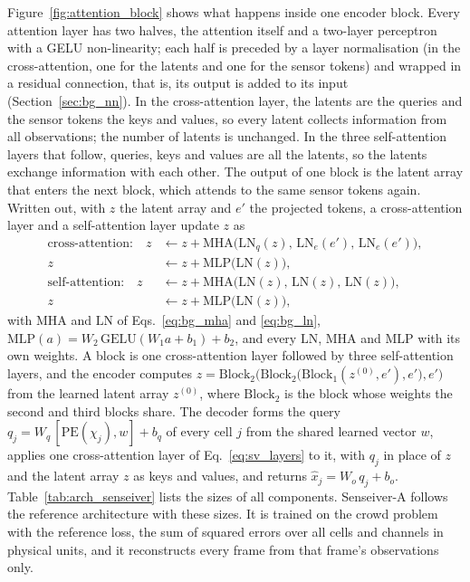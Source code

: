 \documentclass[english, 12pt, a4paper, elec, utf8, a-2b, online]{aaltothesis}
\begin{document}
Figure~\ref{fig:attention_block} shows what happens inside one encoder block.
Every attention layer has two halves, the attention itself and a two-layer
perceptron with a GELU non-linearity; each half is preceded by a layer
normalisation (in the cross-attention, one for the latents and one for the
sensor tokens) and wrapped in a residual connection, that is, its output is
added to its input (Section~\ref{sec:bg_nn}). In the cross-attention layer, the latents are the queries
and the sensor tokens the keys and values, so every latent collects information
from all observations; the number of latents is unchanged. In the three
self-attention layers that follow, queries, keys and values are all the
latents, so the latents exchange information with each other. The output of
one block is the latent array that enters the next block, which attends to the
same sensor tokens again. Written out, with $z$ the latent array and $e'$ the
projected tokens, a cross-attention layer and a self-attention layer update $z$
as
\begin{equation}
	\begin{aligned}
	\text{cross-attention:}\quad
	z &\leftarrow z + \mathrm{MHA}\big(\mathrm{LN}_{q}(z),\, \mathrm{LN}_{e}(e'),\, \mathrm{LN}_{e}(e')\big), \\
	z &\leftarrow z + \mathrm{MLP}\big(\mathrm{LN}(z)\big), \\
	\text{self-attention:}\quad
	z &\leftarrow z + \mathrm{MHA}\big(\mathrm{LN}(z),\, \mathrm{LN}(z),\, \mathrm{LN}(z)\big), \\
	z &\leftarrow z + \mathrm{MLP}\big(\mathrm{LN}(z)\big),
	\end{aligned}
	\label{eq:sv_layers}
\end{equation}
with $\mathrm{MHA}$ and $\mathrm{LN}$ of Eqs.~\eqref{eq:bg_mha} and
\eqref{eq:bg_ln}, $\mathrm{MLP}(a) = W_2\, \mathrm{GELU}(W_1 a + b_1) + b_2$,
and every $\mathrm{LN}$, $\mathrm{MHA}$ and $\mathrm{MLP}$ with its own weights.
A block is one cross-attention layer followed by three
self-attention layers, and the encoder computes
$z = \mathrm{Block}_2\big(\mathrm{Block}_2\big(\mathrm{Block}_1(z^{(0)}, e'), e'\big), e'\big)$
from the learned latent array $z^{(0)}$, where $\mathrm{Block}_2$ is the block
whose weights the second and third blocks share. The decoder forms the query
$q_j = W_q\, [\mathrm{PE}(\chi_j), w] + b_q$ of every cell $j$ from the shared
learned vector $w$, applies one cross-attention layer of
Eq.~\eqref{eq:sv_layers} to it, with $q_j$ in place of $z$ and the latent array
$z$ as keys and values, and returns $\hat{x}_j = W_o\, q_j + b_o$.
Table~\ref{tab:arch_senseiver} lists the sizes
of all components. Senseiver\nobreakdash-A follows the reference architecture with these
sizes. It is trained on the crowd problem with the reference loss, the sum of squared errors over all cells and
channels in physical units, and it reconstructs every frame from that frame's
observations only.
\end{document}
